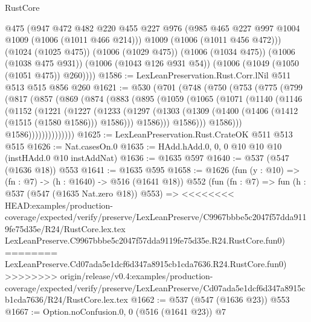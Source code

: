 \begin{lexlean}{RustCore}
\begin{coremodule}
{\begin{coremodule}
{{{{{        @475
        (@947
          @472
          @482
          @220
          @455
          @227
          @976
          (@985 @465 @227 @997 @1004 @1009 (@1006 (@1011 @466 @214)))
          @1009
          (@1006 (@1011 @456 @472)))
        (@1024 (@1025 @475))
        (@1006 (@1029 @475))
        (@1006 (@1034 @475))
        (@1006 (@1038 @475 @931))
        (@1006 (@1043 @126 @931 @54))
        (@1006 (@1049 (@1050 (@1051 @475)) @260))))
@1586 := LexLeanPreservation.Rust.Corr.lNil @511 @513 @515 @856 @260
@1621 := @530
    (@701
      (@748
        (@750
          (@753
            (@775
              (@799
                (@817
                  (@857
                    (@869
                      (@874
                        (@883
                          (@895
                            (@1059
                              (@1065
                                (@1071
                                  (@1140
                                    (@1146
                                      (@1152
                                        (@1221
                                          (@1227
                                            (@1233
                                              (@1297
                                                (@1303
                                                  (@1309
                                                    (@1400
                                                      (@1406 (@1412 (@1515 (@1580 @1586))) @1586)))
                                                  @1586)))
                                            @1586)))
                                      @1586)))
                                @1586))))))))))))))
@1625 := LexLeanPreservation.Rust.CrateOK @511 @513 @515
@1626 := Nat.casesOn.{0}
@1635 := HAdd.hAdd.{0, 0, 0} @10 @10 @10 (instHAdd.{0} @10 instAddNat)
@1636 := @1635 @597
@1640 := @537 (@547 (@1636 @18)) @553
@1641 := @1635 @595
@1658 := @1626
    (fun (y : @10) => (fn : @7) -> (h : @1640) -> @516 (@1641 @18))
    @552
    (fun (fn : @7) =>
    fun (h : @537 (@547 (@1635 Nat.zero @18)) @553) =>
<<<<<<<< HEAD:examples/production-coverage/expected/verify/preserve/LexLeanPreserve/C9967bbbe5c2047f57dda9119fe75d35e/R24/RustCore.lex.tex
    LexLeanPreserve.C9967bbbe5c2047f57dda9119fe75d35e.R24.RustCore.fun0)
========
    LexLeanPreserve.Cd07ada5e1dcf6d347a8915cb1cda7636.R24.RustCore.fun0)
>>>>>>>> origin/release/v0.4:examples/production-coverage/expected/verify/preserve/LexLeanPreserve/Cd07ada5e1dcf6d347a8915cb1cda7636/R24/RustCore.lex.tex
@1662 := @537 (@547 (@1636 @23)) @553
@1667 := Option.noConfusion.{0, 0} (@516 (@1641 @23)) @7
}}}}}
\end{coremodule}}
\end{coremodule}
\end{lexlean}
